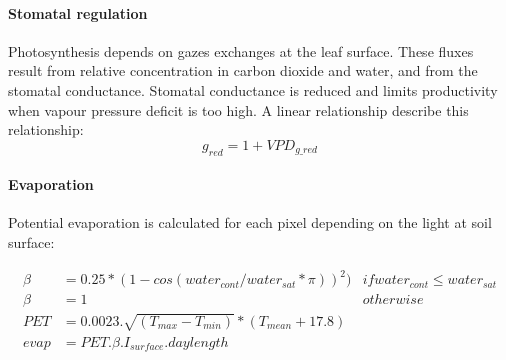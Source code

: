 \documentclass[a4paper,twoside, justified,marginals=raggedright]{tufte-handout}
\begin{document}
\paragraph{Stomatal regulation} Photosynthesis depends on gazes exchanges at the leaf surface. These fluxes result from relative concentration in carbon dioxide and water, and from the stomatal conductance. Stomatal conductance is reduced and limits productivity when vapour pressure deficit is too high. A linear relationship describe this relationship:
\begin{equation}
g_{red} = 1+ VPD_{g\_red}
\end{equation}

\paragraph{Evaporation} Potential evaporation is calculated for each pixel depending on the light at soil surface:

\begin{align}
 \beta &= 0.25 * (1 - cos( water_{cont}/water_{sat} * \pi))^{2}) & if water_{cont} \le water_{sat}\\
 \beta &= 1 & otherwise\\
 PET &= 0.0023. \sqrt{(T_{max} - T_{min})} * (T_{mean} + 17.8)\\
 evap &= PET . \beta . I_{surface} . daylength
\end{align}
\end{document}
